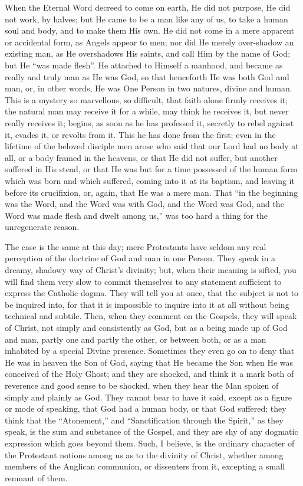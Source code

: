 When the Eternal Word decreed to come on earth, He did not purpose,
He did not work, by halves; but He came to be a man like any of us, to
take a human soul and body, and to make them His own. He did not come
in a mere apparent or accidental form, as Angels appear to men; nor
did He merely over-shadow an existing man, as He overshadows His
saints, and call Him by the name of God; but He ``was made
flesh''. He attached to Himself a manhood, and became as really
and truly man as He was God, so that henceforth He was both God and
man, or, in other words, He was One Person in two natures, divine and
human. This is a mystery so marvellous, so difficult, that faith alone
firmly receives it; the natural man may receive it for a while, may
think he receives it, but never really receives it; begins, as soon as
he has professed it, secretly to rebel against it, evades it, or
revolts from it. This he has done from the first; even in the lifetime
of the beloved disciple men arose who said that our Lord had no body
at all, or a body framed in the heavens, or that He did not suffer,
but another suffered in His stead, or that He was but for a time
possessed of the human form which was born and which suffered, coming
into it at its baptism, and leaving it before its crucifixion, or,
again, that He was a mere man. That ``in the beginning was the
Word, and the Word was with God, and the Word was God, and the Word
was made flesh and dwelt among us,'' was too hard a thing for the
unregenerate reason.

The case is the same at this day; mere Protestants have seldom any
real perception of the doctrine of God and man in one Person. They
speak in a dreamy, shadowy way of Christ's divinity; but, when their
meaning is sifted, you will find them very slow to commit themselves
to any statement sufficient to express the Catholic dogma. They will
tell you at once, that the subject is not to be inquired into, for
that it is impossible to inquire into it at all without being
technical and subtile. Then, when they comment on the Gospels, they
will speak of Christ, not simply and consistently as God, but as a
being made up of God and man, partly one and partly the other, or
between both, or as a man inhabited by a special Divine presence.
Sometimes they even go on to deny that He was in heaven the Son of
God, saying that He became the Son when He was conceived of the Holy
Ghost; and they are shocked, and think it a mark both of reverence and
good sense to be shocked, when they hear the Man spoken of simply and
plainly as God. They cannot bear to have it said, except as a figure
or mode of speaking, that God had a human body, or that God suffered;
they think that the ``Atonement,'' and ``Sanctification
through the Spirit,'' as they speak, is the sum and substance of
the Gospel, and they are shy of any dogmatic expression which goes
beyond them. Such, I believe, is the ordinary character of the
Protestant notions among us as to the divinity of Christ, whether
among members of the Anglican communion, or dissenters from it,
excepting a small remnant of them.

